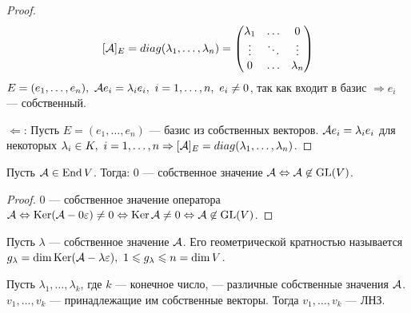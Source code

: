 \documentclass[main]{subfiles}
\begin{document}
\begin{proof}
    \[ [\mathcal{A}]_E = diag(\lambda_1, \ldots, \lambda_n) = \begin{pmatrix}
            \lambda_1 & \ldots & 0         \\
            \vdots    & \ddots & \vdots    \\
            0         & \ldots & \lambda_n \\
        \end{pmatrix}\]
    $ E = (e_1, \ldots, e_n),\ \mathcal{A} e_i = \lambda_i e_i,\ i = 1, \ldots, n,\ e_i \neq 0 $,
    так как входит в базис $\Rightarrow e_i$ — собственный.

    $\Leftarrow$: Пусть  $E = (e_1, \ldots, e_n)$ — базис из собственных векторов.
    $\mathcal{A} e_i = \lambda_i e_i$ для некоторых $\lambda_i \in K, \ i = 1, \ldots, n
        \Rightarrow [\mathcal{A}]_E
        = diag(\lambda_1, \ldots, \lambda_n)$.
\end{proof}

\begin{lemma}
    Пусть $\mathcal{A} \in \operatorname{End} V$. Тогда: 0 — собственное значение $\mathcal{A}
        \Leftrightarrow \mathcal{A} \not\in \operatorname{GL}(V)$.
\end{lemma}

\begin{proof}
    0 — собственное значение оператора $\mathcal{A} \Leftrightarrow
        \operatorname{Ker} (\mathcal{A} - 0\varepsilon) \neq 0 \Leftrightarrow
        \operatorname{Ker} \mathcal{A} \neq 0 \Leftrightarrow \mathcal{A} \not\in \operatorname{GL}(V)$.
\end{proof}

\begin{definition} 
    Пусть $\lambda$ — собственное значение $\mathcal{A}$.
    Его геометрической кратностью называется
    $g_\lambda = \dim \operatorname{Ker} (\mathcal{A} -\lambda\varepsilon),\ 1 \leqslant g_\lambda \leqslant n = \dim V$.
\end{definition}

\begin{proposition}
    Пусть $\lambda_1, \ldots, \lambda_k$, где $k$ — конечное число, — различные собственные значения $\mathcal{A}$.
    $v_1, \ldots, v_k$ — принадлежащие им собственные векторы.
    Тогда  $v_1, \ldots, v_k$ — ЛНЗ.
\end{proposition}
\end{document}
